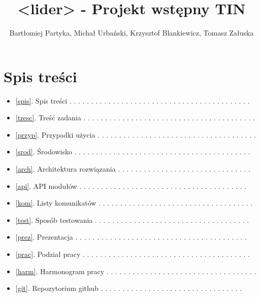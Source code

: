 \documentclass{article}
\author{Bartłomiej Partyka, Michał Urbański, Krzysztof Blankiewicz, Tomasz Załuska}
\title{<lider> - Projekt wstępny TIN}
\begin{document}
\maketitle

\section{Spis treści\label{spis}}

\begin{itemize}

    \item \ref{spis}. Spis treści . . . . . . . . . . . . . . . . . . . . . . . . . . . . . . . . . . . . . . . . . . \pageref{spis}
    \item \ref{tresc}. Treść zadania . . . . . . . . . . . . . . . . . . . . . . . . . . . . . . . . . . . . . . . . \pageref{tresc}
    \item \ref{przyp}. Przypadki użycia . . . . . . . . . . . . . . . . . . . . . . . . . . . . . . . . . . . . . \pageref{przyp}
    \item \ref{srod}. Środowisko . . . . . . . . . . . . . . . . . . . . . . . . . . . . . . . . . . . . . . . . . \pageref{srod}
    \item \ref{arch}. Architektura rozwiązania . . . . . . . . . . . . . . . . . . . . . . . . . . . . . . . \pageref{arch}
    \item \ref{api}. API modułów . . . . . . . . . . . . . . . . . . . . . . . . . . . . . . . . . . . . . . . \pageref{api}
    \item \ref{kom}. Listy komunikatów . . . . . . . . . . . . . . . . . . . . . . . . . . . . . . . . . . . . \pageref{kom}
    \item \ref{test}. Sposób testowania . . . . . . . . . . . . . . . . . . . . . . . . . . . . . . . . . . . . \pageref{test}
    \item \ref{prez}. Prezentacja . . . . . . . . . . . . . . . . . . . . . . . . . . . . . . . . . . . . . . . . \pageref{prez}
    \item \ref{prac}. Podział pracy . . . . . . . . . . . . . . . . . . . . . . . . . . . . . . . . . . . . . . . \pageref{prac}
    \item \ref{harm}. Harmonogram pracy . . . . . . . . . . . . . . . . . . . . . . . . . . . . . . . . . . . \pageref{harm}
    \item \ref{git}. Repozytorium github . . . . . . . . . . . . . . . . . . . . . . . . . . . . . . . . . \pageref{git}


\end{itemize}
\end{document}
